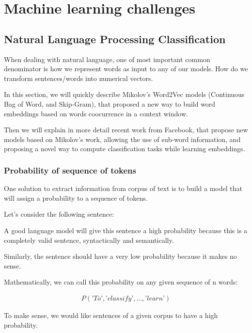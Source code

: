 \chapter{Machine learning challenges}
\label{cha:results}


\section{Natural Language Processing Classification}

When dealing with natural language, one of most important common denominator is how we represent words as input to any of our models. How do we transform sentences/words into numerical vectors.

In this section, we will quickly describe Mikolov's Word2Vec models (Continuous Bag of Word, and Skip-Gram), that proposed a new way to build word embeddings based on words coocurrence in a context window.

Then we will explain in more detail recent work from Facebook, that propose new models based on Mikolov's work, allowing the use of sub-word information, and proposing a novel way to compute classification tasks while learning embeddings.

\subsection{Probability of sequence of tokens}

One solution to extract information from corpus of text is to build a model that will assign a probability to a sequence of tokens. 

Let's consider the following sentence: 

A good language model will give this sentence a high probability because this is a completely valid sentence, syntactically and semantically.

Similarly, the sentence  should have a very low probability because it makes no sense. 

Mathematically, we can call this probability on any given sequence of n words:

\begin{align}
	P(\textit{'To'},\textit{'classify'}, ..., \textit{'learn'})
\end{align}

To make sense, we would like sentences of a given corpus to have a high probability.

